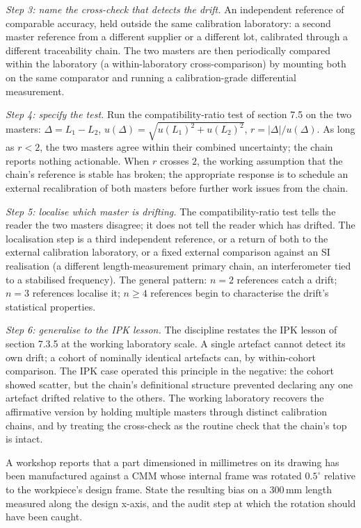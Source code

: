 \emph{Step 3: name the cross-check that detects the drift.}
An independent reference of comparable accuracy, held outside the
same calibration laboratory: a second master reference from a
different supplier or a different lot, calibrated through a
different traceability chain. The two masters are then periodically
compared within the laboratory (a within-laboratory
cross-comparison) by mounting both on the same comparator and
running a calibration-grade differential measurement.

\emph{Step 4: specify the test.}
Run the compatibility-ratio test of section 7.5 on the two
masters: $\Delta = L_{1} - L_{2}$, $u(\Delta) = \sqrt{u(L_{1})^{2}
+ u(L_{2})^{2}}$, $r = |\Delta| / u(\Delta)$. As long as $r < 2$,
the two masters agree within their combined uncertainty; the
chain reports nothing actionable. When $r$ crosses $2$, the
working assumption that the chain's reference is stable has
broken; the appropriate response is to schedule an external
recalibration of both masters before further work issues from
the chain.

\emph{Step 5: localise which master is drifting.}
The compatibility-ratio test tells the reader the two masters
disagree; it does not tell the reader which has drifted. The
localisation step is a third independent reference, or a return
of both to the external calibration laboratory, or a fixed
external comparison against an SI realisation (a different
length-measurement primary chain, an interferometer tied to a
stabilised frequency). The general pattern: $n = 2$ references
catch a drift; $n = 3$ references localise it; $n \geq 4$
references begin to characterise the drift's statistical
properties.

\emph{Step 6: generalise to the IPK lesson.}
The discipline restates the IPK lesson of section 7.3.5 at the
working laboratory scale. A single artefact cannot detect its own
drift; a cohort of nominally identical artefacts can, by
within-cohort comparison. The IPK case operated this principle in
the negative: the cohort showed scatter, but the chain's
definitional structure prevented declaring any one artefact
drifted relative to the others. The working laboratory recovers
the affirmative version by holding multiple masters through
distinct calibration chains, and by treating the cross-check as
the routine check that the chain's top is intact.

\begin{exercise}
A workshop reports that a part dimensioned in millimetres on its
drawing has been manufactured against a CMM whose internal frame
was rotated $0.5^{\circ}$ relative to the workpiece's design
frame. State the resulting bias on a $300 \,\si{\milli\meter}$
length measured along the design x-axis, and the audit step at which
the rotation should have been caught.
\end{exercise}


